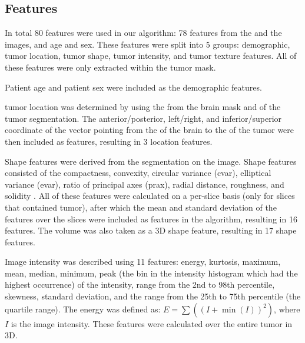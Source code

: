 \begin{subappendices}
\subsection{Features}
In total 80 features were used in our algorithm: 78 features from the  and the  images, and age and sex.
These features were split into 5 groups: demographic, \gls{tumor} location, \gls{tumor} shape, \gls{tumor} intensity, and \gls{tumor} texture features.
All of these features were only extracted within the \gls{tumor} mask.

Patient age and patient sex were included as the demographic features.

\Gls{tumor} location was determined by using the  from the brain mask and  of the \gls{tumor} segmentation.
The anterior/posterior, left/right, and inferior/superior coordinate of the vector pointing from the  of the brain to the  of the \gls{tumor} were then included as features, resulting in 3 location features.

Shape features were derived from the segmentation on the  image.
Shape features consisted of the compactness, convexity, circular variance (cvar), elliptical variance (evar), ratio of principal axes (prax), radial distance, roughness, and solidity \autocite{peura1997efficiency, xu2012comprehensive}.
All of these features were calculated on a per-slice basis (only for slices that contained \gls{tumor}), after which the mean and standard deviation of the features over the slices were included as features in the algorithm, resulting in 16 features.
The volume was also taken as a 3D shape feature, resulting in 17 shape features.

Image intensity was described using 11 features: energy, kurtosis, maximum, mean, median, minimum, peak (the bin in the intensity histogram which had the highest occurrence) of the intensity, range from the 2nd to 98th percentile, skewness, standard deviation, and the range from the 25th to 75th percentile (the quartile range).
The energy was defined as: $E = \sum \left( {\left( I + \min(I)\right)}^2\right)$, where $I$ is the image intensity.
These features were calculated over the entire \gls{tumor} in 3D.



\end{subappendices}
